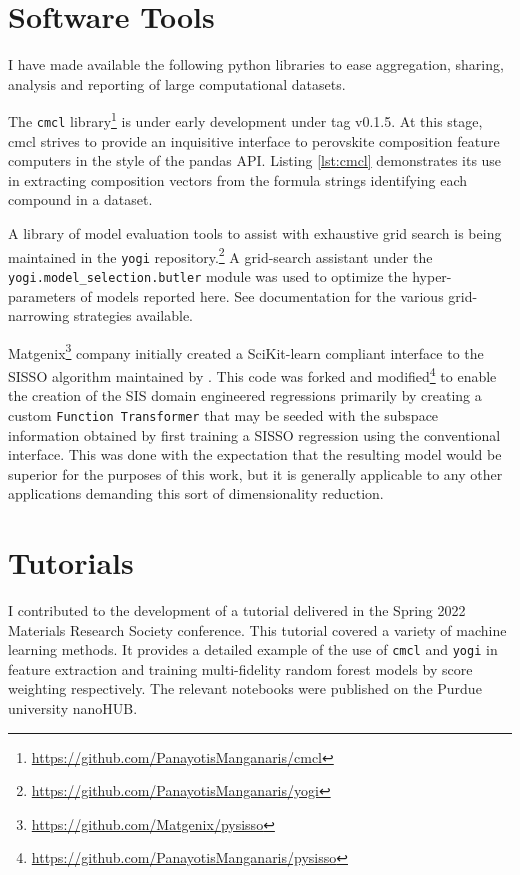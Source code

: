 \section{Software Tools}
\label{sec:org85fe2a5}
I have made available the following python libraries to ease aggregation, sharing, analysis and reporting of large computational datasets.

The \texttt{cmcl} library\footnote{\url{https://github.com/PanayotisManganaris/cmcl}} is under early development under tag v0.1.5.
At this stage, cmcl strives to provide an inquisitive interface to perovskite composition feature computers in the style of the pandas API.
Listing \ref{lst:cmcl} demonstrates its use in extracting composition vectors from the formula strings identifying each compound in a dataset.

A library of model evaluation tools to assist with exhaustive grid search is being maintained in the \texttt{yogi} repository.\footnote{\url{https://github.com/PanayotisManganaris/yogi}}
A grid-search assistant under the \texttt{yogi.model\_selection.butler} module was used to optimize the hyper-parameters of models reported here.
See documentation for the various grid-narrowing strategies available.

Matgenix\footnote{\url{https://github.com/Matgenix/pysisso}} company initially created a SciKit-learn compliant interface to the SISSO algorithm maintained by \textcite{ouyang-2018-sisso}.
This code was forked and modified\footnote{\url{https://github.com/PanayotisManganaris/pysisso}} to enable the creation of the SIS domain engineered regressions primarily by creating a custom \texttt{Function Transformer} that may be seeded with the subspace information obtained by first training a SISSO regression using the conventional interface.
This was done with the expectation that the resulting model would be superior for the purposes of this work, but it is generally applicable to any other applications demanding this sort of dimensionality reduction.

\section{Tutorials}
\label{sec:org5689b18}
I contributed to the development of a tutorial delivered in the Spring 2022 Materials Research Society conference.
This tutorial covered a variety of machine learning methods.
It provides a detailed example of the use of \texttt{cmcl} and \texttt{yogi} in feature extraction and training multi-fidelity random forest models by score weighting respectively.
The relevant notebooks were published on the Purdue university nanoHUB.
